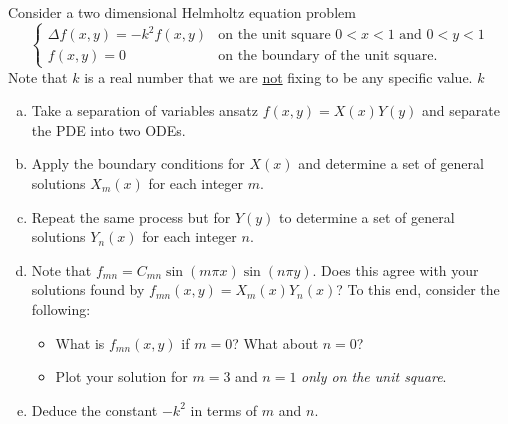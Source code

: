 \documentclass[12pt]{amsbook}
\begin{document}
\begin{problem}
Consider a two dimensional Helmholtz equation problem
\[
\begin{cases}
    \Delta f(x,y) = -k^2 f(x,y) & \textrm{on the unit square $0<x<1$ and $0<y<1$}\\
    f(x,y) = 0 & \textrm{on the boundary of the unit square}.
\end{cases}
\]
Note that $k$ is a real number that we are \underline{not} fixing to be any specific value. $k$ 
\begin{enumerate}[(a)]
\vspace*{0.25cm}
    \item Take a separation of variables ansatz $f(x,y)=X(x)Y(y)$ and separate the PDE into two ODEs.
\vspace*{0.25cm}
    \item Apply the boundary conditions for $X(x)$ and determine a set of general solutions $X_m(x)$ for each integer $m$.
\vspace*{0.25cm}
    \item Repeat the same process but for $Y(y)$ to determine a set of general solutions $Y_n(x)$ for each integer $n$.
\vspace*{0.25cm}
    \item Note that $f_{mn}=C_{mn}\sin(m\pi x)\sin(n \pi y)$. Does this agree with your solutions found by $f_{mn}(x,y)=X_m(x)Y_n(x)$? To this end, consider the following:
\vspace*{0.25cm}
\begin{itemize}
    \item What is $f_{mn}(x,y)$ if $m=0$? What about $n=0$? 
\vspace*{0.25cm}
    \item Plot your solution for $m=3$ and $n=1$ \emph{only on the unit square}.
\end{itemize}
\vspace*{0.25cm}
    \item Deduce the constant $-k^2$ in terms of $m$ and $n$. 
\end{enumerate}
\end{problem}
\end{document}
